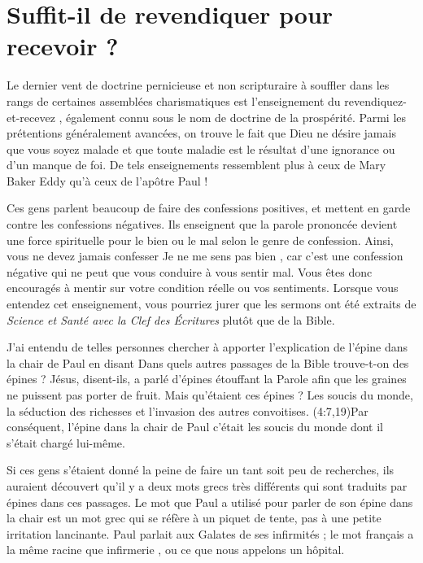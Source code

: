 \section{Suffit-il de revendiquer pour recevoir ?}

Le dernier vent de doctrine pernicieuse et non scripturaire à \linebreak
 souffler dans les rangs de certaines assemblées charismatiques
 est l'en\-sei\-gne\-ment du \Og revendiquez-et-recevez \Fg{},
 également connu sous le nom de doctrine de la prospérité.
 Parmi les prétentions généralement avancées, on trouve le fait
 que Dieu ne désire jamais que vous soyez malade et que toute maladie
 est le résultat d'une ignorance ou d'un manque de foi.
 De tels enseignements ressemblent plus à ceux de Mary Baker Eddy
 qu'à ceux de l'apôtre Paul !

Ces gens parlent beaucoup de faire des confessions positives,
 et mettent en garde contre les confessions négatives.
 Ils enseignent que la parole prononcée devient une force spirituelle
 pour le bien ou le mal selon le genre de confession.
 Ainsi, vous ne devez jamais confesser\frcolon{} \Og Je ne me sens pas bien \Fg{},
 car c'est une confession négative qui ne peut que vous conduire à vous sentir mal.
 Vous êtes donc encouragés à mentir sur votre condition réelle
 ou vos sentiments. Lorsque vous entendez cet enseignement,
 vous pourriez jurer que les sermons ont été extraits
 de \emph{Science et Santé avec la Clef des Écritures} plutôt que de la Bible.

J'ai entendu de telles personnes chercher à apporter l'explication
 de l'épine dans la chair de Paul en disant\frcolon{}
 \Og Dans quels autres passages de la Bible trouve-t-on des épines ?
 Jésus, disent-ils, a parlé d'épines étouffant la Parole afin
 que les graines ne puissent pas porter de fruit. \Fg{}
 Mais qu'étaient ces épines ? Les soucis du monde,
 la séduction des richesses et l'invasion des autres convoitises.
 (4:7,19)Par conséquent, l'épine dans la chair de Paul
 c'était les soucis du monde dont il s'était chargé lui-même.

Si ces gens s'étaient donné la peine de faire un tant soit peu de recherches,
 ils auraient découvert qu'il y a deux mots grecs très différents
 qui sont traduits par \Og épines \Fg{} dans ces passages.
 Le mot que Paul a utilisé pour parler de son épine dans la chair
 est un mot grec qui se réfère à un piquet de tente,
 pas à une petite irritation lancinante.
 Paul parlait aux Galates de ses infirmités ;
 le mot français a la même racine que \Og infirmerie \Fg{},
 ou ce que nous appelons un hôpital.

